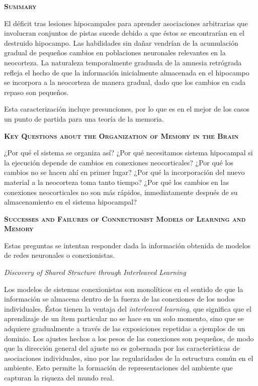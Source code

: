 \documentclass[a4paper,12pt]{article}
\begin{document}
{\scshape\bfseries Summary}

El déficit tras lesiones hipocampales para aprender asociaciones arbitrarias que involucran conjuntos de pistas sucede debido a que éstos se encontrarían en el destruido hipocampo. Las habilidades sin dañar vendrían de la acumulación gradual de pequeños cambios en poblaciones neuronales relevantes en la neocorteza. La naturaleza temporalmente graduada de la amnesia retrógrada refleja el hecho de que la información inicialmente almacenada en el hipocampo se incorpora a la neocorteza de manera gradual, dado que los cambios en cada repaso son pequeños.

Esta caracterización incluye presunciones, por lo que es en el mejor de los casos un punto de partida para una teoría de la memoria.

{\scshape\bfseries Key Questions about the Organization of Memory in the Brain}

¿Por qué el sistema se organiza así?
¿Por qué necesitamos sistema hipocampal si la ejecución depende de cambios en conexiones neocorticales? ¿Por qué los cambios no se hacen ahí en primer lugar? ¿Por qué la incorporación del nuevo material a la neocorteza toma tanto tiempo? ¿Por qué los cambios en las conexiones neocorticales no son más rápidos, inmediatamente después de su almacenamiento en el sistema hipocampal?

{\scshape\bfseries Successes and Failures of Connectionist Models of Learning and Memory}

Estas preguntas se intentan responder dada la información obtenida de modelos de redes neuronales o conexionistas.

{\itshape Discovery of Shared Structure through Interleaved Learning}

Los modelos de sistemas conexionistas son monolíticos en el sentido de que la información se almacena dentro de la fuerza de las conexiones de los nodos individuales. Éstos tienen la ventaja del {\itshape interleaved learning}, que significa que el aprendizaje de un ítem particular no se hace en un solo momento, sino que se adquiere gradualmente a través de las exposiciones repetidas a ejemplos de un dominio. Los ajustes hechos a los pesos de las conexiones son pequeños, de modo que la dirección general del ajuste no es gobernada por las características de asociaciones individuales, sino por las regularidades de la estructura común en el ambiente. Esto permite la formación de representaciones del ambiente que capturan la riqueza del mundo real.
\end{document}
